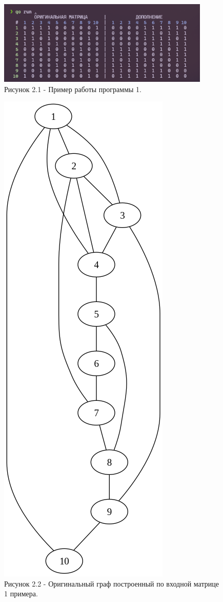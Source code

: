 \documentclass[oneside,a4paper,14pt]{extarticle}
\begin{document}
\clearpage
\begin{figure}[H]
	\centering
	\includegraphics[width=0.9\textwidth]{pics/screen1.png}
	\caption*{Рисунок 2.1 - Пример работы программы 1.}
\end{figure}

\begin{figure}[H]
	\centering
	\includegraphics[height=0.5\textheight]{pics/original_graph1.png}
	\caption*{Рисунок 2.2 - Оригинальный граф построенный по входной матрице 1 примера.}
\end{figure}
\end{document}
